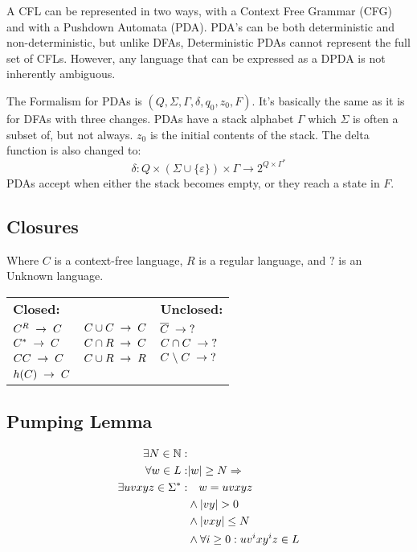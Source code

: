 A CFL can be represented in two ways, with a Context Free Grammar (CFG) and with 
a Pushdown Automata (PDA). PDA's can be both deterministic and non-deterministic,
but unlike DFAs, Deterministic PDAs cannot represent the full set of CFLs. However,
any language that can be expressed as a DPDA is not inherently ambiguous.

The Formalism for PDAs is $(Q, \Sigma, \Gamma, \delta, q_0, z_0, F)$. 
It's basically the same as it is for DFAs with three changes. PDAs
have a stack alphabet $\Gamma$ which $\Sigma$ is often a subset of, but not
always. $z_0$ is the initial contents of the stack. The delta function is 
also changed to:
\[
    \delta : Q \times (\Sigma \cup \{\varepsilon\}) \times \Gamma 
    \to 2^{Q \times \Gamma^*}
\]
PDAs accept when either the stack becomes empty, or they reach a state in $F$.

\subsection{Closures}
Where $C$ is a context-free language, $R$ is a regular language, and $?$ is
an Unknown language.

\settowidth{\templength}{$C \cup C \spto C$}
\addtolength{\templength}{1cm}
\begin{tabular}{lp{\templength}l}
\textbf{Closed:} & & \textbf{Unclosed:} \\
$C^R \;\to\; C$ & $C \cup C \spto C$ & $\overline{C} \;\to\; ?$\\
$C^* \;\to\; C$ & $C \cap R \;\to\; C$ & $C \cap C \;\to\; ?$\\
$CC \;\to\; C$  & $C \cup R \;\to\; R$ & $C \;\backslash\; C \;\to\; ?$\\
$h(C) \;\to\; C$ & & \\
\end{tabular}

\subsection{Pumping Lemma}
\begin{align*}
  \exists N \in \mathbb{N}: & \\
          \forall w \in L : & |w| \geq N \Rightarrow \\
\exists uvxyz \in \Sigma^*: & \quad w = uvxyz \\
                            & \land |vy| > 0 \\
                            & \land |vxy| \leq N \\
                            & \land \forall i \geq 0: uv^ixy^iz \in L
\end{align*}


